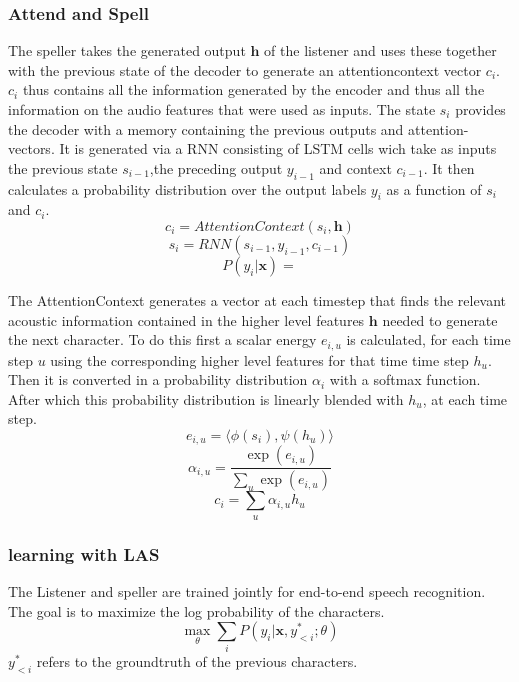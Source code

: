 \documentclass[a4paper]{article}
\begin{document}
\subsubsection{Attend and Spell}
The speller takes the generated output $\bm{h}$ of the listener and uses these together with the previous state of the decoder to generate an attentioncontext vector $c_i$. $c_i$ thus contains all the information generated by the encoder and thus all the information on the  audio features that were used as inputs. The state $s_i$ provides the decoder with a memory containing the previous outputs and attention-vectors. It is generated via a RNN consisting of LSTM cells wich take as inputs the previous state $s_{i-1}$,the preceding output $y_{i-1}$ and context $c_{i-1}$. It then calculates a probability distribution over the output labels $y_i$ as a function of $s_i$ and $c_i$.   
\begin{equation}
c_i = AttentionContext(s_i,\textbf{h})
\end{equation}
\begin{equation}
s_i = RNN(s_{i-1},y_{i-1},c_{i-1})
\end{equation}
\begin{equation}
P(y_i|\textbf{x}) = 
\end{equation}

The AttentionContext generates a vector at each timestep that  finds the relevant acoustic information contained in the higher level features $\bm{h}$ needed to generate the next character. To do this first a scalar energy $e_{i,u}$ is calculated, for each time step $u$ using the corresponding higher level features for that time time step $h_u$. Then it is converted in a probability distribution $\alpha_i$ with a softmax function. After which this probability distribution is linearly blended with $h_u$, at each time step.
\begin{equation}
e_{i,u} = \langle \phi(s_i), \psi(h_u) \rangle
\end{equation}
\begin{equation}
\alpha_{i,u} = \frac{\exp{(e_{i,u})}}{\sum\limits_{u}\exp{(e_{i,u})}}
\end{equation}
\begin{equation}
c_i = \sum\limits_{u}\alpha_{i,u}h_u
\end{equation}
\subsubsection{learning with LAS}
The Listener and speller are trained jointly for end-to-end speech recognition. The goal is to maximize the log probability of the characters.
\begin{equation}
\max\limits_\theta \sum\limits_i P(y_i|\bm{x},y^*_{<i};\theta)
\end{equation}
$y^*_{<i}$ refers to the groundtruth of the previous characters.
\end{document}
